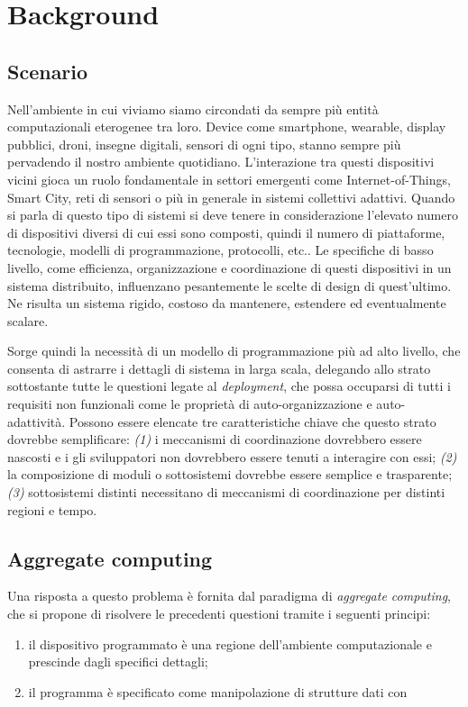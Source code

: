 \chapter{Background}
\section{Scenario}
Nell'ambiente in cui viviamo siamo circondati da sempre più entità
computazionali eterogenee tra loro. Device come smartphone, wearable, display
pubblici, droni, insegne digitali, sensori di ogni tipo, stanno sempre più
pervadendo il nostro ambiente quotidiano. L'interazione tra questi dispositivi
vicini gioca un ruolo fondamentale in settori emergenti come Internet-of-Things,
Smart City, reti di sensori o più in generale in sistemi collettivi
adattivi. Quando si parla di questo tipo di sistemi si deve tenere in
considerazione l'elevato numero di dispositivi diversi di cui essi sono
composti, quindi il numero di piattaforme, tecnologie, modelli di
programmazione, protocolli, etc.. Le specifiche di basso livello, come
efficienza, organizzazione e coordinazione di questi dispositivi in un sistema
distribuito, influenzano pesantemente le scelte di design di quest'ultimo. Ne
risulta un sistema rigido, costoso da mantenere, estendere ed eventualmente
scalare.

Sorge quindi la necessità di un modello di programmazione più ad alto livello,
che consenta di astrarre i dettagli di sistema in larga scala, delegando allo
strato sottostante tutte le questioni legate al \textit{deployment}, che possa
occuparsi di tutti i requisiti non funzionali come le proprietà di
auto-organizzazione e auto-adattività. Possono essere elencate tre
caratteristiche chiave che questo strato dovrebbe semplificare: \textit{(1)} i
meccanismi di coordinazione dovrebbero essere nascosti e i gli sviluppatori non
dovrebbero essere tenuti a interagire con essi; \textit{(2)} la composizione di
moduli o sottosistemi dovrebbe essere semplice e trasparente; \textit{(3)}
sottosistemi distinti necessitano di meccanismi di coordinazione per distinti
regioni e tempo.\cite{DBLP:journals/computer/BealPV15}

\section{Aggregate computing}
Una risposta a questo problema è fornita dal paradigma di \textit{aggregate
  computing}, che si propone di risolvere le precedenti questioni tramite i
seguenti principi:
\begin{enumerate}
\item il dispositivo programmato è una regione dell'ambiente computazionale e
  prescinde dagli specifici dettagli;
\item il programma è specificato come manipolazione di strutture dati con
\end{enumerate}



